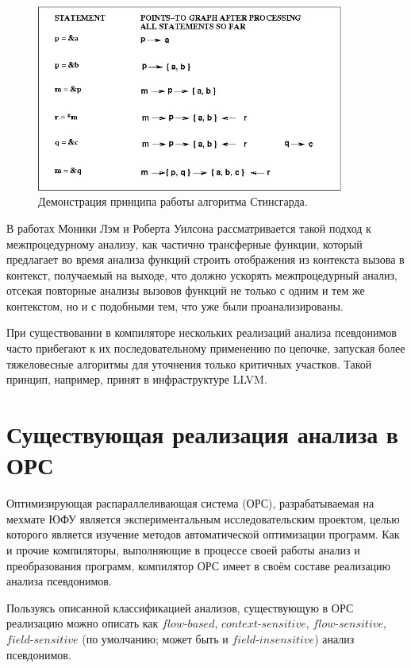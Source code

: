 \begin{figure}[H]
\centering
\includegraphics[width=0.9\textwidth]{img/steensgaard.jpg}
\caption{Демонстрация принципа работы алгоритма Стинсгарда.}
\label{fig:steensgaard}
\end{figure}

В работах Моники Лэм и Роберта Уилсона рассматривается такой подход к межпроцедурному анализу, как частично трансферные функции, который предлагает во время анализа функций строить отображения из контекста вызова в контекст, получаемый на выходе, что должно ускорять межпроцедурный анализ, отсекая повторные анализы вызовов функций не только с одним и тем же контекстом, но и с подобными тем, что уже были проанализированы.

При существовании в компиляторе нескольких реализаций анализа псевдонимов часто прибегают к их последовательному применению по цепочке, запуская более тяжеловесные алгоритмы для уточнения только критичных участков. Такой принцип, например, принят в инфраструктуре LLVM.

\section{Существующая реализация анализа в ОРС}

Оптимизирующая распараллеливающая система (ОРС), разрабатываемая на мехмате ЮФУ является экспериментальным исследовательским проектом, целью которого является изучение методов автоматической оптимизации программ. Как и прочие компиляторы, выполняющие в процессе своей работы анализ и преобразования программ, компилятор ОРС имеет в своём составе реализацию анализа псевдонимов.

Пользуясь описанной классификацией анализов, существующую в ОРС реализацию можно описать как $flow$-$based$, $context$-$sensitive$, $flow$-$sensitive$, $field$-$sensitive$ (по умолчанию; может быть и $field$-$insensitive$) анализ псевдонимов.

